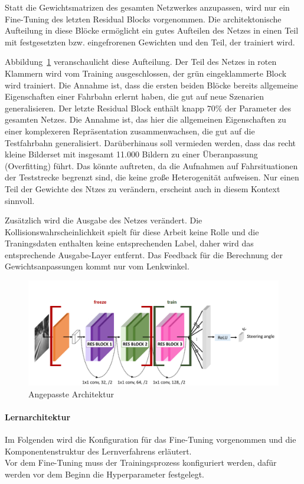 Statt die Gewichtsmatrizen des gesamten Netzwerkes anzupassen, wird nur ein Fine-Tuning des letzten Residual Blocks vorgenommen. Die architektonische Aufteilung in diese Blöcke ermöglicht ein gutes Aufteilen des Netzes in einen Teil mit festgesetzten bzw. eingefrorenen Gewichten und den Teil, der trainiert wird.

Abbildung~\ref{img:dronetfrozen} veranschaulicht diese Aufteilung. Der Teil des Netzes in roten Klammern wird vom Training ausgeschlossen, der grün eingeklammerte Block wird trainiert. Die Annahme ist, dass die ersten beiden Blöcke bereits allgemeine Eigenschaften einer Fahrbahn erlernt haben, die gut auf neue Szenarien generalisieren. Der letzte Residual Block enthält knapp $70\%$ der Parameter des gesamten Netzes. Die Annahme ist, das hier die allgemeinen Eigenschaften zu einer komplexeren Repräsentation zusammenwachsen, die gut auf die Testfahrbahn generalisiert. Darüberhinaus soll vermieden werden, dass das recht kleine Bilderset mit insgesamt 11.000 Bildern zu einer Überanpassung (Overfitting) führt. Das könnte auftreten, da die Aufnahmen auf Fahrsituationen der Teststrecke begrenzt sind, die keine große Heterogenität aufweisen. Nur einen Teil der Gewichte des Ntzes zu verändern, erscheint auch in diesem Kontext sinnvoll.

Zusätzlich wird die Ausgabe des Netzes verändert. Die Kollisionswahrscheinlichkeit spielt für diese Arbeit keine Rolle und die Traningsdaten enthalten keine entsprechenden Label, daher wird das entsprechende Ausgabe-Layer entfernt. Das Feedback für die Berechnung der Gewichtsanpassungen kommt nur vom Lenkwinkel.

\begin{figure}[h]
	\centering
	\includegraphics[scale=0.5]{figures/Architecture-DRONET-FROZEN.png}
	\caption{Angepasste Architektur}
	\label{img:dronetfrozen}
\end{figure}

\paragraph{Lernarchitektur}
Im Folgenden wird die Konfiguration für das Fine-Tuning vorgenommen und die Komponentenstruktur des Lernverfahrens erläutert.\\
Vor dem Fine-Tuning muss der Trainingsprozess konfiguriert werden, dafür werden vor dem Beginn die Hyperparameter festgelegt.

